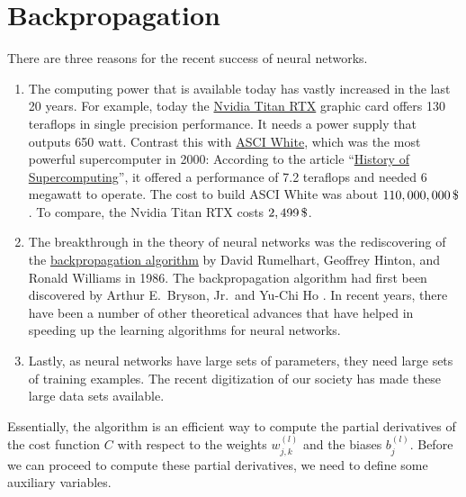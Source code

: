 \section{Backpropagation}
There are three reasons for the recent success of neural networks.
\begin{enumerate}
\item The computing power that is available today has vastly increased in the last 20 years.
      For example, today the
      \href{https://www.nvidia.com/en-us/deep-learning-ai/products/titan-rtx/}{Nvidia Titan RTX}
      graphic card offers  130 teraflops in single precision performance.  It needs a power supply that
      outputs 650 watt.  Contrast this with \href{https://en.wikipedia.org/wiki/ASCI_White}{ASCI White}, which
      was the most powerful supercomputer in 2000: According to the article
      ``\href{https://en.wikipedia.org/wiki/History_of_supercomputing}{History of Supercomputing}'', 
      it  offered a performance of 7.2 teraflops and needed 6 megawatt to operate.  The cost to build ASCI
      White was about $110,000,000\,\symbol{36}$.   To compare, the Nvidia Titan RTX costs $2,499\,\symbol{36}$.
\item The breakthrough in the theory of neural networks was the rediscovering of the
      \href{https://en.wikipedia.org/wiki/Backpropagation}{backpropagation algorithm}  by
      David Rumelhart, Geoffrey Hinton, and Ronald Williams \cite{rumelhart:1986} in 1986.  
      The backpropagation algorithm had first been discovered by Arthur E.~Bryson, Jr.~and Yu-Chi Ho
      \cite{bryson:1969}.  In recent years, there have been a number of other theoretical advances that have
      helped in speeding up the learning algorithms for neural networks.
\item Lastly, as neural networks have large sets of parameters, they need large sets of training examples.  The
      recent digitization of our society has made these large data sets available.
\end{enumerate}
Essentially, the  algorithm is an efficient way to compute the partial derivatives of the
cost function $C$ with respect to the weights $w_{j,k}^{(l)}$ and the biases $b_j^{(l)}$.  Before we can
proceed to compute these partial derivatives, we need to define some auxiliary variables. 

